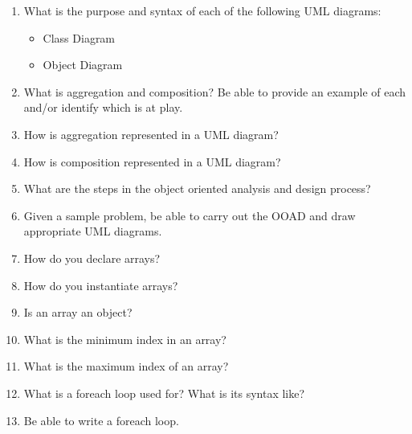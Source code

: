 \documentclass{article}
\begin{document}
\begin{enumerate}
    \item What is the purpose and syntax of each of the following UML
        diagrams:
        \begin{itemize}
            \item Class Diagram
            \item Object Diagram
        \end{itemize}
    \item What is aggregation and composition? Be able to provide an
        example of each and/or identify which is at play.
    \item How is aggregation represented in a UML diagram?
    \item How is composition represented in a UML diagram?
    \item What are the steps in the object oriented analysis and
        design process?
    \item Given a sample problem, be able to carry out the OOAD and
        draw appropriate UML diagrams.
    \item How do you declare arrays?
    \item How do you instantiate arrays?
    \item Is an array an object?
    \item What is the minimum index in an array?
    \item What is the maximum index of an array?
    \item What is a foreach loop used for?  What is its syntax like?
    \item Be able to write a foreach loop.
\end{enumerate}
\end{document}
